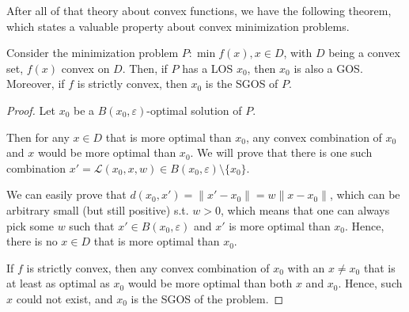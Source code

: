 After all of that theory about convex functions, we have the following theorem,
which states a valuable property about convex minimization problems.

\begin{theorem}
  Consider the minimization problem \( P: \min f(x), x \in D \), with \( D \) being
  a convex set, \( f(x) \) convex on \( D \). Then, if \( P \) has a LOS \(
  x_{0} \), then \( x_{0} \) is also a GOS. Moreover, if \( f \) is strictly
  convex, then \( x_{0} \) is the SGOS of \( P \).
\end{theorem}

\begin{proof}
  Let \( x_{0} \) be a \( B(x_{0}, \varepsilon) \)-optimal solution of \( P \).

  Then for any \( x \in D \) that is more optimal than \( x_{0} \),
  any convex combination of \( x_{0} \) and \( x \) would be more optimal than
  \( x_{0} \). We will prove that there is one such combination \( x' =
  \mathcal{L}(x_{0}, x, w) \in B(x_{0}, \varepsilon) \setminus \{x_{0}\}   \).

  We can easily prove that \( d(x_{0}, x') = \|x'-x_{0}\| = w\|x-x_{0}\| \), which
  can be arbitrary small (but still positive)
  s.t. \( w > 0 \), which means that one can always pick
  some \( w \) such that \( x' \in B(x_{0}, \varepsilon) \) and \( x' \) is more
  optimal than \( x_{0} \). Hence, there is no \( x \in D \) that is more
  optimal than \( x_{0} \).

  If \( f \) is strictly convex, then any convex combination of \( x_{0} \) with
  an \( x \neq  x_{0}  \) that is at least as optimal as \( x_{0} \)
  would be more optimal than both \( x \) and \( x_{0} \). Hence, such \( x \)
  could not exist, and \( x_{0} \) is the SGOS of the problem.
\end{proof}



